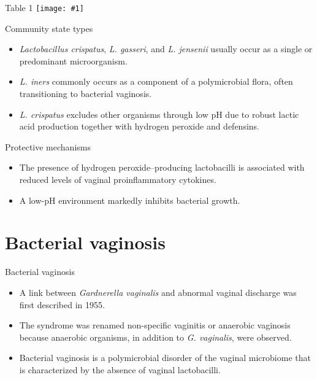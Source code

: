 \documentclass{beamer}
\newcommand*{\solo}[1]{\centering\texttt{[image: \#1]}}
\begin{document}
\begin{frame}{Table 1}
    \solo{T1.eps}
\end{frame}

\begin{frame}{Community state types}
    \begin{itemize}
        \item \textit{Lactobacillus crispatus}, \textit{L. gasseri}, and
              \textit{L. jensenii} usually occur as a single or predominant
              microorganism.
        \item \textit{L. iners} commonly occurs as a component of a
              polymicrobial flora, often transitioning to bacterial vaginosis.
        \item \textit{L. crispatus} excludes other organisms through low pH due
              to robust lactic acid production together with hydrogen peroxide
              and defensins.
    \end{itemize}
\end{frame}

\begin{frame}{Protective mechanisms}
    \begin{itemize}
        \item The presence of hydrogen peroxide--producing lactobacilli is
              associated with reduced levels of vaginal proinflammatory
              cytokines.
        \item A low-pH environment markedly inhibits bacterial growth.
    \end{itemize}
\end{frame}

\section{Bacterial vaginosis}
\begin{frame}{Bacterial vaginosis}
    \begin{itemize}
        \item A link between \textit{Gardnerella vaginalis} and abnormal
              vaginal discharge was first described in 1955.
        \item The syndrome was renamed non-specific vaginitis or anaerobic
              vaginosis because anaerobic organisms, in addition to
              \textit{G. vaginalis}, were observed.
        \item Bacterial vaginosis is a polymicrobial disorder of the vaginal
              microbiome that is characterized by the absence of vaginal
              lactobacilli.
    \end{itemize}
\end{frame}
\end{document}
